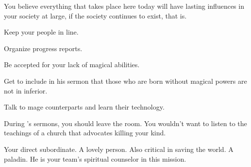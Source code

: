 \documentclass[char]{guildcamp3}
\begin{document}
You believe everything that takes place here today will have lasting influences in your society at large, if the society continues to exist, that is.

\begin{itemz}[Goals]
  \item Keep your people in line.
  \item Organize progress reports.
  \item Be accepted for your lack of magical abilities.
  \item Get \cPaladin{} to include in his sermon that those who are born without magical powers are not in inferior.
  \item Talk to mage counterparts and learn their technology.
\end{itemz}

\begin{itemz}[Notes]
	\item During \cPaladin{\formal}'s sermons, you should leave the room. You wouldn't want to listen to the teachings of a church that advocates killing your kind. 
\end{itemz}


\begin{contacts}
  \contact{\cNobleTwo{}} Your direct subordinate. 
  \contact{\cMageOne{}} A lovely person. Also critical in saving the world.
  \contact{\cPaladin{}} A paladin. He is your team's spiritual counselor in this mission.
\end{contacts}
\end{document}
